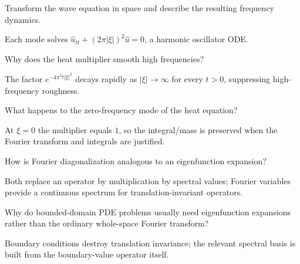 \begin{problem}\label{prob:iii28-problem-04}
Transform the wave equation in space and describe the resulting frequency dynamics.
\end{problem}
\begin{solution}
Each mode solves
\(\widehat u_{tt}+(2\pi|\xi|)^2\widehat u=0\), a harmonic oscillator ODE.
\end{solution}

\begin{problem}\label{prob:iii28-problem-05}
Why does the heat multiplier smooth high frequencies?
\end{problem}
\begin{solution}
The factor \(e^{-4\pi^2t|\xi|^2}\) decays rapidly as \(|\xi|\to\infty\)
for every \(t>0\), suppressing high-frequency roughness.
\end{solution}

\begin{problem}\label{prob:iii28-problem-06}
What happens to the zero-frequency mode of the heat equation?
\end{problem}
\begin{solution}
At \(\xi=0\) the multiplier equals \(1\), so the integral/mass is preserved
when the Fourier transform and integrals are justified.
\end{solution}

\begin{problem}\label{prob:iii28-problem-07}
How is Fourier diagonalization analogous to an eigenfunction expansion?
\end{problem}
\begin{solution}
Both replace an operator by multiplication by spectral values; Fourier
variables provide a continuous spectrum for translation-invariant operators.
\end{solution}

\begin{problem}\label{prob:iii28-problem-08}
Why do bounded-domain PDE problems usually need eigenfunction expansions rather than the ordinary whole-space Fourier transform?
\end{problem}
\begin{solution}
Boundary conditions destroy translation invariance; the relevant spectral
basis is built from the boundary-value operator itself.
\end{solution}

